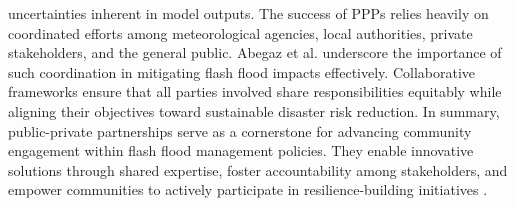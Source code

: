 uncertainties inherent in model outputs. The success of PPPs relies heavily on coordinated efforts among meteorological agencies, local authorities, private stakeholders, and the general public. Abegaz et al. \citep{Abegaz2024} underscore the importance of such coordination in mitigating flash flood impacts effectively. Collaborative frameworks ensure that all parties involved share responsibilities equitably while aligning their objectives toward sustainable disaster risk reduction. In summary, public-private partnerships serve as a cornerstone for advancing community engagement within flash flood management policies. They enable innovative solutions through shared expertise, foster accountability among stakeholders, and empower communities to actively participate in resilience-building initiatives \citep{Saad2024}\citep{Abegaz2024}\citep{Borga2019}.

